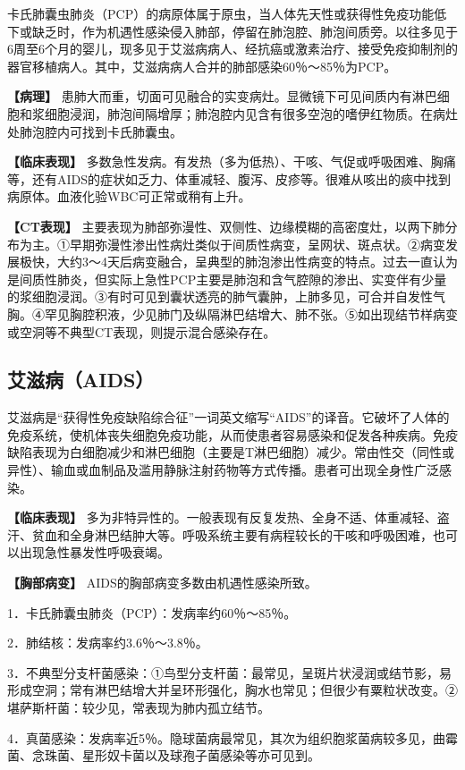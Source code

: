 卡氏肺囊虫肺炎（PCP）的病原体属于原虫，当人体先天性或获得性免疫功能低下或缺乏时，作为机遇性感染侵入肺部，停留在肺泡腔、肺泡间质旁。以往多见于6周至6个月的婴儿，现多见于艾滋病病人、经抗癌或激素治疗、接受免疫抑制剂的器官移植病人。其中，艾滋病病人合并的肺部感染60％～85％为PCP。

\textbf{【病理】}
患肺大而重，切面可见融合的实变病灶。显微镜下可见间质内有淋巴细胞和浆细胞浸润，肺泡间隔增厚；肺泡腔内见含有很多空泡的嗜伊红物质。在病灶处肺泡腔内可找到卡氏肺囊虫。

\textbf{【临床表现】}
多数急性发病。有发热（多为低热）、干咳、气促或呼吸困难、胸痛等，还有AIDS的症状如乏力、体重减轻、腹泻、皮疹等。很难从咳出的痰中找到病原体。血液化验WBC可正常或稍有上升。

\textbf{【CT表现】}
主要表现为肺部弥漫性、双侧性、边缘模糊的高密度灶，以两下肺分布为主。①早期弥漫性渗出性病灶类似于间质性病变，呈网状、斑点状。②病变发展极快，大约3～4天后病变融合，呈典型的肺泡渗出性病变的特点。过去一直认为是间质性肺炎，但实际上急性PCP主要是肺泡和含气腔隙的渗出、实变伴有少量的浆细胞浸润。③有时可见到囊状透亮的肺气囊肿，上肺多见，可合并自发性气胸。④罕见胸腔积液，少见肺门及纵隔淋巴结增大、肺不张。⑤如出现结节样病变或空洞等不典型CT表现，则提示混合感染存在。

\subsection{艾滋病（AIDS）}

艾滋病是“获得性免疫缺陷综合征”一词英文缩写“AIDS”的译音。它破坏了人体的免疫系统，使机体丧失细胞免疫功能，从而使患者容易感染和促发各种疾病。免疫缺陷表现为白细胞减少和淋巴细胞（主要是T淋巴细胞）减少。常由性交（同性或异性）、输血或血制品及滥用静脉注射药物等方式传播。患者可出现全身性广泛感染。

\textbf{【临床表现】}
多为非特异性的。一般表现有反复发热、全身不适、体重减轻、盗汗、贫血和全身淋巴结肿大等。呼吸系统主要有病程较长的干咳和呼吸困难，也可以出现急性暴发性呼吸衰竭。

\textbf{【胸部病变】} AIDS的胸部病变多数由机遇性感染所致。

1．卡氏肺囊虫肺炎（PCP）：发病率约60％～85％。

2．肺结核：发病率约3.6％～3.8％。

3．不典型分支杆菌感染：①鸟型分支杆菌：最常见，呈斑片状浸润或结节影，易形成空洞；常有淋巴结增大并呈环形强化，胸水也常见；但很少有粟粒状改变。②堪萨斯杆菌：较少见，常表现为肺内孤立结节。

4．真菌感染：发病率近5％。隐球菌病最常见，其次为组织胞浆菌病较多见，曲霉菌、念珠菌、星形奴卡菌以及球孢子菌感染等亦可见到。

